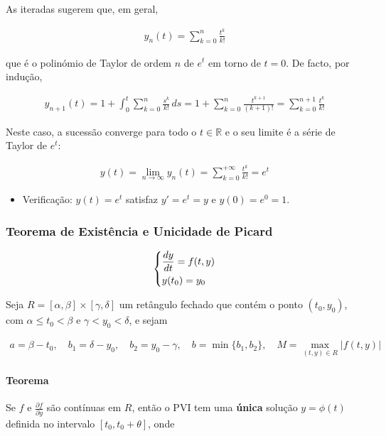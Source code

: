 \documentclass{article}
\begin{document}
As iteradas sugerem que, em geral,

\begin{gather*}
\boxed{y_n(t) = \sum_{k=0}^{n} \frac{t^k}{k!}}
\end{gather*}

que é o polinómio de Taylor de ordem $n$ de $e^t$ em torno de $t = 0$.
De facto, por indução,

\begin{gather*}
y_{n+1}(t) = 1 + \int_{0}^{t} \sum_{k=0}^{n} \frac{s^k}{k!} \, ds
= 1 + \sum_{k=0}^{n} \frac{t^{k+1}}{(k+1)!}
= \sum_{k=0}^{n+1} \frac{t^k}{k!}
\end{gather*}

Neste caso, a sucessão converge para todo o $t \in \mathbb{R}$ e o seu limite é a série de Taylor de $e^t$:

\begin{gather*}
\boxed{y(t) = \lim_{n \to \infty} y_n(t) = \sum_{k=0}^{+\infty} \frac{t^k}{k!} = e^t}
\end{gather*}

\begin{itemize}
    \item Verificação: $y(t) = e^t$ satisfaz $y' = e^t = y$ e $y(0) = e^0 = 1$.
\end{itemize}

\bigskip

\subsubsection{Teorema de Existência e Unicidade de Picard}
\label{subsubsec: teorema-existencia-unicidade-picard}

\begin{gather*}
\begin{dcases}
\frac{dy}{dt} = f(t, y) \\
y(t_0) = y_0
\end{dcases}
\end{gather*}

Seja $R = [\alpha, \beta] \times [\gamma, \delta]$ um retângulo fechado que contém o ponto $(t_0, y_0)$,
com $\alpha \leq t_0 < \beta$ e $\gamma < y_0 < \delta$, e sejam

\begin{gather*}
a = \beta - t_0, \quad b_1 = \delta - y_0, \quad b_2 = y_0 - \gamma, \quad
b = \min\{b_1, b_2\}, \quad M = \max_{(t,y) \in R} |f(t,y)|
\end{gather*}

\paragraph{Teorema}
Se $f$ e $\frac{\partial f}{\partial y}$ são contínuas em $R$, então o PVI tem uma \textbf{única} solução
$y = \phi(t)$ definida no intervalo $[t_0, t_0 + \theta]$, onde
\end{document}
